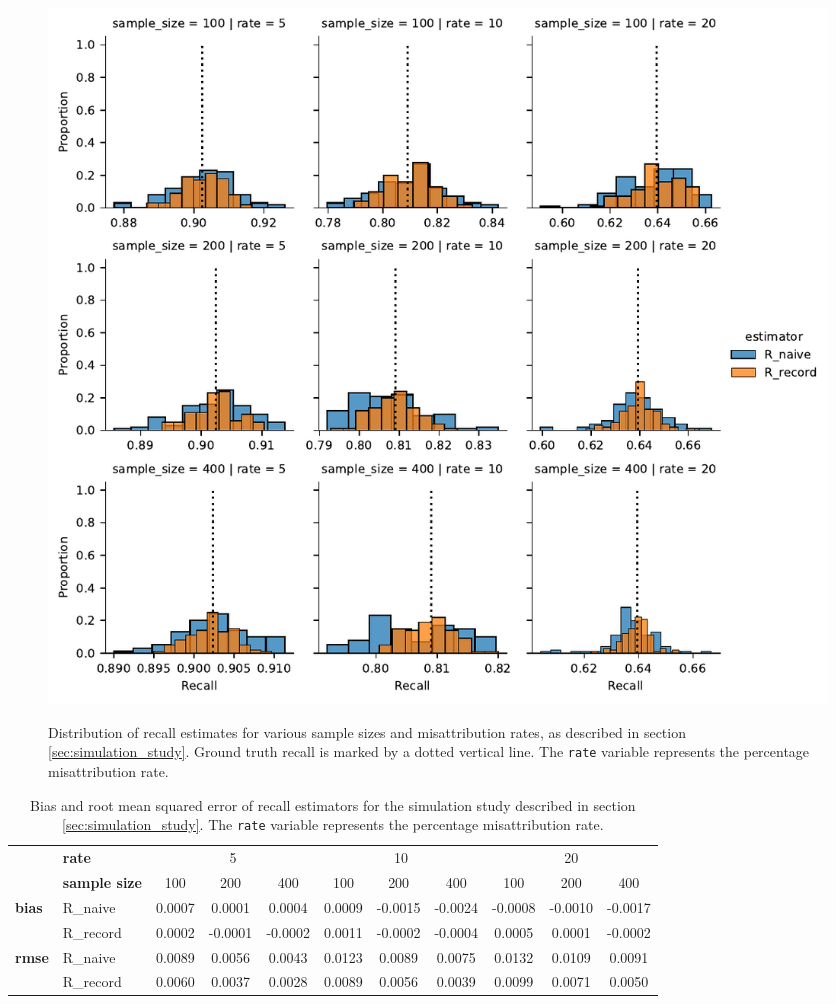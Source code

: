 \documentclass[fontsize=11pt]{article}
\theoremstyle{definition}
\begin{document}
\begin{figure}
    \centering
        \caption{Distribution of recall estimates for various sample sizes and misattribution rates, as described in section \ref{sec:simulation_study}. Ground truth recall is marked by a dotted vertical line. The \texttt{rate} variable represents the percentage misattribution rate.}
    \includegraphics[width=\linewidth]{sim_records_recall}
    \label{fig:recall_results}
\end{figure}

\begin{table}\label{tab:recall_results}
    \centering
    \caption{\centering Bias and root mean squared error of recall estimators for the simulation study described in section \ref{sec:simulation_study}. The \texttt{rate} variable represents the percentage misattribution rate.}
\begin{tabular}{llccccccccc}
\toprule
{} & {\textbf{rate}} & \multicolumn{3}{c}{{5}} & \multicolumn{3}{c}{10} & \multicolumn{3}{c}{20} \\
\cmidrule(lr){3-5}\cmidrule(lr){6-8}\cmidrule(lr){9-11}
{} & {\textbf{sample size}} & {100} & {200} & {400} & {100} & {200} & {400} & {100} & {200} & {400} \\
\midrule
\multirow[c]{2}{*}{\textbf{bias}} & R\_naive & 0.0007 & 0.0001 & 0.0004 & 0.0009 & -0.0015 & -0.0024 & -0.0008 & -0.0010 & -0.0017 \\
 & R\_record & 0.0002 & -0.0001 & -0.0002 & 0.0011 & -0.0002 & -0.0004 & 0.0005 & 0.0001 & -0.0002 \\
 \midrule
\multirow[c]{2}{*}{\textbf{rmse}} & R\_naive & 0.0089 & 0.0056 & 0.0043 & 0.0123 & 0.0089 & 0.0075 & 0.0132 & 0.0109 & 0.0091 \\
 & R\_record & 0.0060 & 0.0037 & 0.0028 & 0.0089 & 0.0056 & 0.0039 & 0.0099 & 0.0071 & 0.0050 \\
\bottomrule
\end{tabular}


\end{table}
\end{document}
